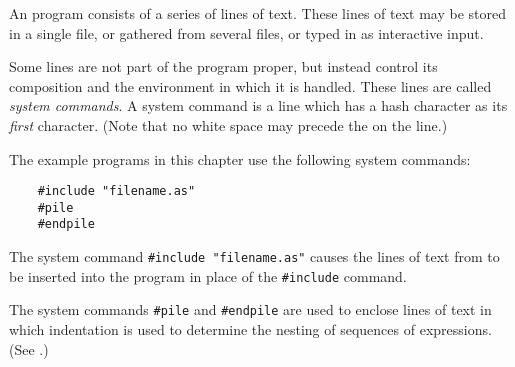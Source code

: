 



An \asharp{} program consists of a series of lines of text.
These lines of text may be stored in a single file, or gathered
from several files, or typed in as interactive input. 

Some lines are not part of the \asharp{} program proper, but instead
control its composition and the environment in which it is handled.  
These lines are called {\em system commands}.  A system command%
 is a line which has a hash character
\ttin{\#} as its {\em first}
character.  (Note that no white space may precede the \ttin{\#} on the
line.)

The example programs in this chapter use the following system commands:

\begin{small}
\begin{verbatim}
    #include "filename.as"
    #pile
    #endpile
\end{verbatim}
\end{small}

The system command {\tt \#include "filename.as"} causes the lines of text
from  to be inserted into the \asharp{} program in place
of the {\tt \#include} command.

The system commands {\tt \#pile} and {\tt \#endpile} are used to enclose
lines of text in which indentation is used to determine the nesting of
sequences of \asharp{} expressions.  (See .)

